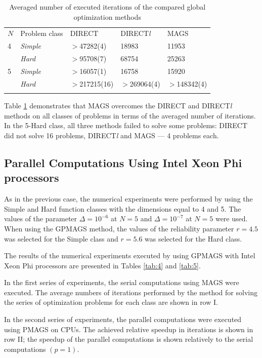 \documentclass{aims}
\theoremstyle{definition}
\begin{document}
\begin{table}
  \caption{Averaged number of executed iterations of the compared global optimization methods}
  \label{tab:3}
  \center
  \begin{tabular}{lllll}
    \hline\noalign{\smallskip}
     $N$ & Problem class & DIRECT & DIRECT\textit{l} & MAGS \\
    \noalign{\smallskip} \hline \noalign{\smallskip}
      4 &	\textit{Simple}	& $>$47282(4) &	18983 &	11953 \\
        & \textit{Hard} &	$>$95708(7) &	68754 &	25263 \\
      5	& \textit{Simple} &	$>$16057(1) &	16758 &	15920 \\
        & \textit{Hard} &	$>$217215(16) &	$>$269064(4) & $>$148342(4) \\
    \noalign{\smallskip}\hline
  \end{tabular}
\end{table}

Table \ref{tab:3} demonstrates that MAGS overcomes the DIRECT and DIRECT\textit{l} methods
on all classes of problems in terms of the averaged number of iterations.
In the 5-Hard class, all three methods failed to solve some problems: DIRECT did not
solve 16 problems, DIRECT\textit{l} and MAGS --- 4 problems each.

\subsection{Parallel Computations Using Intel Xeon Phi processors}
As in the previous case, the numerical experiments were performed by using the Simple
and Hard function classes with the dimensions equal to 4 and 5. The values of the
parameter \(\Delta=10^{-6}\) at \(N=5\) and \(\Delta=10^{-7}\) at \(N=5\) were used.
When using the GPMAGS method, the values of the reliability parameter \(r=4.5\) was
selected for the Simple class and \(r=5.6\) was selected for the Hard class.

The results of the numerical experiments executed by using GPMAGS with Intel Xeon Phi processors are presented in Tables \ref{tab:4} and \ref{tab:5}.

In the first series of experiments, the serial computations using MAGS were executed.
The average numbers of iterations performed by the method for solving the series of optimization problems
for each class are shown in row I.

In the second series of experiments, the parallel computations were executed using PMAGS on CPUs.
The achieved relative speedup in iterations is shown in row II; the speedup of the
parallel computations is shown relatively to the serial computations \((p=1)\).
\end{document}
